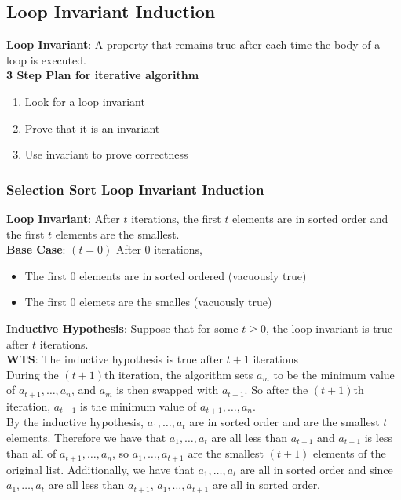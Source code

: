 \documentclass{article}
\begin{document}
\begin{spacing}{1.5}
\subsection{Loop Invariant Induction}
\label{sec:invariant}
 \textbf{Loop Invariant}: A property that remains true after each time the body of a loop is executed.\\
 \textbf{3 Step Plan for iterative algorithm}
 \begin{enumerate}
     \item Look for a loop invariant
     \item Prove that it is an invariant
     \item Use invariant to prove correctness
 \end{enumerate}
 \subsubsection{Selection Sort Loop Invariant Induction}
 \label{sec:selectionsortproof}
 \textbf{Loop Invariant}: After $t$ iterations, the first $t$ elements are in sorted order and the first $t$ elements are the smallest.\\
 \textbf{Base Case}: $(t=0)$ After $0$ iterations,
 \begin{itemize}
     \item The first $0$ elements are in sorted ordered (vacuously true)
     \item The first $0$ elemets are the smalles (vacuously true)
 \end{itemize}
 \textbf{Inductive Hypothesis}: Suppose that for some $t \geq 0$, the loop invariant is true after $t$ iterations.\\
 \textbf{WTS}: The inductive hypothesis is true after $t+1$ iterations\\
 During the $(t+1)$th iteration, the algorithm sets $a_m$ to be the minimum value of $a_{t+1},\dots,a_n$, and $a_m$ is then swapped with $a_{t+1}$. So after the $(t+1)$th iteration, $a_{t+1}$ is the minimum value of $a_{t+1},\dots,a_n$.\\
 By the inductive hypothesis, $a_1,\dots,a_t$ are in sorted order and are the smallest $t$ elements. Therefore we have that $a_1,\dots,a_t$ are all less than $a_{t+1}$ and $a_{t+1}$ is less than all of $a_{t+1},\dots,a_n$, so $a_1,\dots,a_{t+1}$ are the smallest $(t+1)$ elements of the original list. Additionally, we have that $a_1,\dots,a_t$ are all in sorted order and since $a_1,\dots,a_t$ are all less than $a_{t+1}$, $a_1,\dots,a_{t+1}$ are all in sorted order.

\end{spacing}
\end{document}

